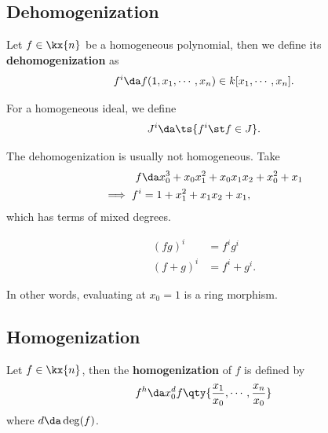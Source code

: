\hypertarget{dehomogenization}{%
\subsection{Dehomogenization}\label{dehomogenization}}

\begin{definition}

Let \(f\in \kx{n}\) be a homogeneous polynomial, then we define its
\textbf{dehomogenization} as
\begin{align*}  
f^i \da f(1, x_1, \cdots, x_n) \in k[x_1,\cdots, x_n]
.\end{align*}

For a homogeneous ideal, we define
\begin{align*}  
J^i \da \ts{f^i \st f\in J}
.\end{align*}

\end{definition}

\begin{example}

The dehomogenization is usually not homogeneous. Take
\begin{align*}  
f &\da x_0^3 + x_0 x_1^2 + x_0 x_1 x_2 + x_0^2 + x_1 \\
\implies f^i &= 1  +x_1^2 + x_1 x_2 + x_1
,\end{align*} which has terms of mixed degrees.

\end{example}

\begin{remark}

\begin{align*}  
(fg)^i &= f^i g^i \\
(f+g)^i &= f^i + g^i
.\end{align*}

In other words, evaluating at \(x_0 = 1\) is a ring morphism.

\end{remark}

\hypertarget{homogenization}{%
\subsection{Homogenization}\label{homogenization}}

\begin{definition}

Let \(f\in \kx{n}\), then the \textbf{homogenization} of \(f\) is
defined by
\begin{align*}  
f^h \da x_0^d f\qty{ {x_1 \over x_0}, \cdots, {x_n \over x_0} }
\end{align*} where \(d\da \deg(f)\).

\end{definition}

